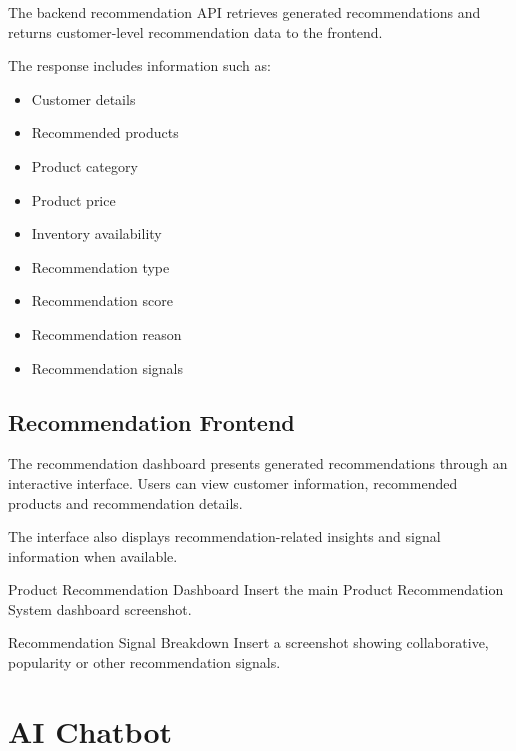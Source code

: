 \documentclass[12pt,a4paper]{report}
\begin{document}
The backend recommendation API retrieves generated recommendations and
returns customer-level recommendation data to the frontend.

The response includes information such as:

\begin{itemize}
    \item Customer details
    \item Recommended products
    \item Product category
    \item Product price
    \item Inventory availability
    \item Recommendation type
    \item Recommendation score
    \item Recommendation reason
    \item Recommendation signals
\end{itemize}

\subsection{Recommendation Frontend}

The recommendation dashboard presents generated recommendations through
an interactive interface. Users can view customer information,
recommended products and recommendation details.

The interface also displays recommendation-related insights and signal
information when available.

\begin{screenshotplaceholder}{Product Recommendation Dashboard}
Insert the main Product Recommendation System dashboard screenshot.
\end{screenshotplaceholder}

\begin{screenshotplaceholder}{Recommendation Signal Breakdown}
Insert a screenshot showing collaborative, popularity or other
recommendation signals.
\end{screenshotplaceholder}


\section{AI Chatbot}
\end{document}
